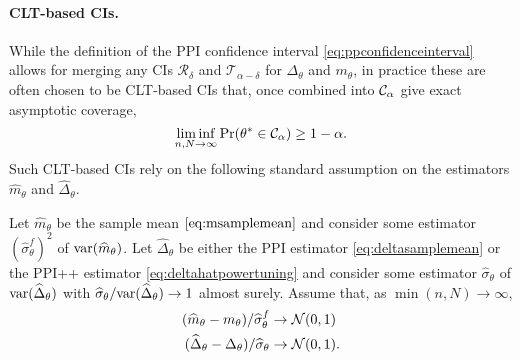 \paragraph{CLT-based CIs.}
While the definition of the PPI confidence interval \eqref{eq:ppconfidenceinterval} allows for merging any CIs $\mathcal{R}_\delta$ and $\mathcal{T}_{\alpha-\delta}$ for $\Delta_\theta$ and $m_\theta$, in practice these are often chosen to be CLT-based CIs that, once combined into $\mathcal C_\alpha$ give exact asymptotic coverage,
\begin{equation*}
    \liminf_{n,N \to \infty} \mathrm{Pr}(\theta^* \in \mathcal C_\alpha) \geq 1 - \alpha.
\end{equation*}
Such CLT-based CIs rely on the following standard assumption on the estimators $\widehat m_\theta$ and $\widehat \Delta_\theta$.
\begin{assumption}
\label{assump:clt}
    Let  $\widehat m_\theta$ be the sample mean $\eqref{eq:msamplemean}$ and consider some estimator $(\widehat \sigma^f_\theta)^2$ of $\mathrm{var}(\widehat m_\theta)$.
    Let $\widehat \Delta_\theta$ be either the PPI estimator \eqref{eq:deltasamplemean} or the PPI++ estimator \eqref{eq:deltahatpowertuning} and consider some estimator $\widehat \sigma_\theta$ of $\mathrm{var}(\widehat \Delta_\theta)$ with $\widehat\sigma_\theta/\mathrm{var}(\widehat \Delta_\theta) \to 1$ almost surely.  Assume that, as $\min(n,N)\to\infty$,
    \begin{align}
        (\widehat m_\theta - m_\theta) / \widehat \sigma^f_\theta & \to \mathcal N(0,1)\\
        (\widehat\Delta_\theta -\Delta_\theta) / \widehat\sigma_\theta &\to \mathcal N(0,1).
    \end{align}
\end{assumption}


